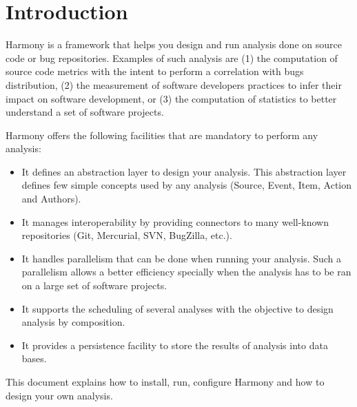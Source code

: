 \chapter{Introduction}\label{chap:Introduction}

Harmony is a framework that helps you design and run analysis done on source code or bug repositories. Examples of such analysis are (1) the computation of source code metrics with the intent to perform a correlation with bugs distribution, (2) the measurement of software developers practices to infer their impact on software development, or (3) the computation of statistics to better understand a set of software projects.

Harmony offers the following facilities that are mandatory to perform any analysis:
\begin{itemize}
\item It defines an abstraction layer to design your analysis. This abstraction layer defines few simple concepts  used by any analysis (Source, Event, Item, Action and Authors).
\item It manages interoperability by providing connectors to many well-known repositories (Git, Mercurial, SVN, BugZilla, etc.).
\item It handles parallelism that can be done when running your analysis. Such a parallelism allows a better efficiency specially when the analysis has to be ran on a large set of software projects.
\item It supports the scheduling of several analyses with the objective to design analysis by composition.
\item It provides a persistence facility to store the results of analysis into data bases.
\end{itemize}

This document explains how to install, run, configure Harmony and how to design your own analysis.